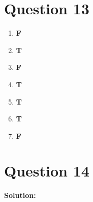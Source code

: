 \documentclass[11pt]{article} %
\begin{document}
\section{Question 13}
\begin{enumerate}
	\item \textbf{F}
	\item \textbf{T}
	\item \textbf{F}
	\item \textbf{T}
	\item \textbf{T}
	\item \textbf{T}
	\item \textbf{F}
\end{enumerate}

\section{Question 14}
\textbf{Solution:}
\end{document}
